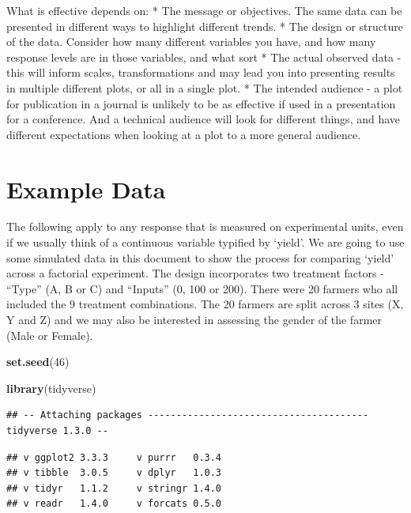 \documentclass[
]{book}
\newenvironment{Shaded}{\begin{snugshade}}{\end{snugshade}}
\newcommand{\DecValTok}[1]{\textcolor[rgb]{0.00,0.00,0.81}{#1}}
\newcommand{\KeywordTok}[1]{\textcolor[rgb]{0.13,0.29,0.53}{\textbf{#1}}}
\newcommand{\NormalTok}[1]{#1}
\begin{document}
What is effective depends on:
* The message or objectives. The same data can be presented in different ways to highlight different trends.
* The design or structure of the data. Consider how many different variables you have, and how many response levels are in those variables, and what sort
* The actual observed data - this will inform scales, transformations and may lead you into presenting results in multiple different plots, or all in a single plot.
* The intended audience - a plot for publication in a journal is unlikely to be as effective if used in a presentation for a conference. And a technical audience will look for different things, and have different expectations when looking at a plot to a more general audience.

\hypertarget{example-data}{%
\section{Example Data}\label{example-data}}

The following apply to any response that is measured on experimental units, even if we usually think of a continuous variable typified by `yield'. We are going to use some simulated data in this document to show the process for comparing `yield' across a factorial experiment. The design incorporates two treatment factors - ``Type'' (A, B or C) and ``Inputs'' (0, 100 or 200). There were 20 farmers who all included the 9 treatment combinations. The 20 farmers are split across 3 sites (X, Y and Z) and we may also be interested in assessing the gender of the farmer (Male or Female).

\begin{Shaded}
\begin{Highlighting}[]
\KeywordTok{set.seed}\NormalTok{(}\DecValTok{46}\NormalTok{)}

\KeywordTok{library}\NormalTok{(tidyverse)}
\end{Highlighting}
\end{Shaded}

\begin{verbatim}
## -- Attaching packages --------------------------------------- tidyverse 1.3.0 --
\end{verbatim}

\begin{verbatim}
## v ggplot2 3.3.3     v purrr   0.3.4
## v tibble  3.0.5     v dplyr   1.0.3
## v tidyr   1.1.2     v stringr 1.4.0
## v readr   1.4.0     v forcats 0.5.0
\end{verbatim}
\end{document}
